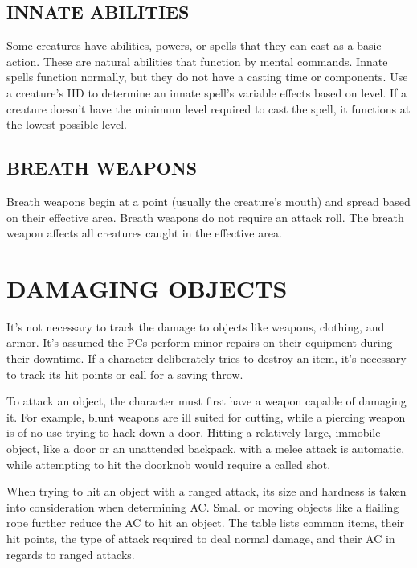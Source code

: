 \begin{multicols}{2}

\subsection{INNATE ABILITIES}

Some creatures have abilities, powers, or spells that they can cast as a basic action.  These are natural abilities that function by mental commands.  Innate spells function normally, but they do not have a casting time or components.  Use a creature's HD to determine an innate spell's variable effects based on level.  If a creature doesn't have the minimum level required to cast the spell, it functions at the lowest possible level.

\subsection{BREATH WEAPONS}

Breath weapons begin at a point (usually the creature's mouth) and spread based on their effective area.  Breath weapons do not require an attack roll.  The breath weapon affects all creatures caught in the effective area.

\section{DAMAGING OBJECTS}

It's not necessary to track the damage to objects like weapons, clothing, and armor.  It's assumed the PCs perform minor repairs on their equipment during their downtime.  If a character deliberately tries to destroy an item, it's necessary to track its hit points or call for a saving throw.

To attack an object, the character must first have a weapon capable of damaging it.  For example, blunt weapons are ill suited for cutting, while a piercing weapon is of no use trying to hack down a door.  Hitting a relatively large, immobile object, like a door or an unattended backpack, with a melee attack is automatic, while attempting to hit the doorknob would require a called shot.  

When trying to hit an object with a ranged attack, its size and hardness is taken into consideration when determining AC.  Small or moving objects like a flailing rope further reduce the AC to hit an object.  The table lists common items, their hit points, the type of attack required to deal normal damage, and their AC in regards to ranged attacks.


\end{multicols}
